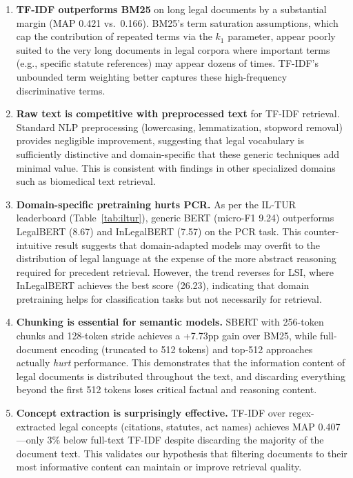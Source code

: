 \documentclass[11pt]{article}
\begin{document}
\begin{enumerate}
    \item \textbf{TF-IDF outperforms BM25} on long legal documents by a substantial margin (MAP 0.421 vs.~0.166). BM25's term saturation assumptions, which cap the contribution of repeated terms via the $k_1$ parameter, appear poorly suited to the very long documents in legal corpora where important terms (e.g., specific statute references) may appear dozens of times. TF-IDF's unbounded term weighting better captures these high-frequency discriminative terms.

    \item \textbf{Raw text is competitive with preprocessed text} for TF-IDF retrieval. Standard NLP preprocessing (lowercasing, lemmatization, stopword removal) provides negligible improvement, suggesting that legal vocabulary is sufficiently distinctive and domain-specific that these generic techniques add minimal value. This is consistent with findings in other specialized domains such as biomedical text retrieval.

    \item \textbf{Domain-specific pretraining hurts PCR.} As per the IL-TUR leaderboard (Table~\ref{tab:iltur}), generic BERT (micro-F1 9.24) outperforms LegalBERT (8.67) and InLegalBERT (7.57) on the PCR task. This counter-intuitive result suggests that domain-adapted models may overfit to the distribution of legal language at the expense of the more abstract reasoning required for precedent retrieval. However, the trend reverses for LSI, where InLegalBERT achieves the best score (26.23), indicating that domain pretraining helps for classification tasks but not necessarily for retrieval.

    \item \textbf{Chunking is essential for semantic models.} SBERT with 256-token chunks and 128-token stride achieves a +7.73pp gain over BM25, while full-document encoding (truncated to 512 tokens) and top-512 approaches actually \emph{hurt} performance. This demonstrates that the information content of legal documents is distributed throughout the text, and discarding everything beyond the first 512 tokens loses critical factual and reasoning content.

    \item \textbf{Concept extraction is surprisingly effective.} TF-IDF over regex-extracted legal concepts (citations, statutes, act names) achieves MAP 0.407---only 3\% below full-text TF-IDF despite discarding the majority of the document text. This validates our hypothesis that filtering documents to their most informative content can maintain or improve retrieval quality.
\end{enumerate}
\end{document}
